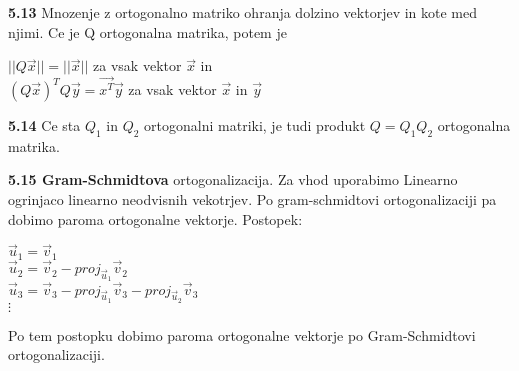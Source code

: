 \documentclass{article}
\begin{document}
\begin{multicols}{4}
\textbf{5.13} Mnozenje z ortogonalno matriko ohranja dolzino vektorjev in kote med njimi. Ce je Q
ortogonalna matrika, potem je 
\begin{center}
    $|| Q \vec{x} || = || \vec{x} ||$ za vsak vektor $\vec{x}$ in\\
    $(Q\vec{x})^{T}Q\vec{y} = \vec{x^{T}} \vec{y}$ za vsak vektor $\vec{x}$ in $\vec{y}$
\end{center}

\textbf{5.14} Ce sta $Q_{1}$ in $Q_{2}$ ortogonalni matriki, je tudi produkt $Q = Q_{1}Q_{2}$ ortogonalna
matrika.

\textbf{5.15 Gram-Schmidtova} ortogonalizacija. Za vhod uporabimo Linearno ogrinjaco linearno neodvisnih vekotrjev. Po 
gram-schmidtovi ortogonalizaciji pa dobimo paroma ortogonalne vektorje.
Postopek:
\begin{center}
    \begin{math}
        \vec{u}_{1} = \vec{v}_{1}
    \end{math}\\
    \begin{math}
        \vec{u}_{2} = \vec{v}_{2} - proj_{\vec{u}_{1}}\vec{v}_{2}
    \end{math}\\
    \begin{math}
        \vec{u}_{3} = \vec{v}_{3} - proj_{\vec{u}_{1}}\vec{v}_{3} - proj_{\vec{u}_{2}}\vec{v}_{3}
    \end{math}\\
    \begin{math}
        \vdots
    \end{math}
\end{center}
Po tem postopku dobimo paroma ortogonalne vektorje po Gram-Schmidtovi ortogonalizaciji.



\end{multicols}
\end{document}
